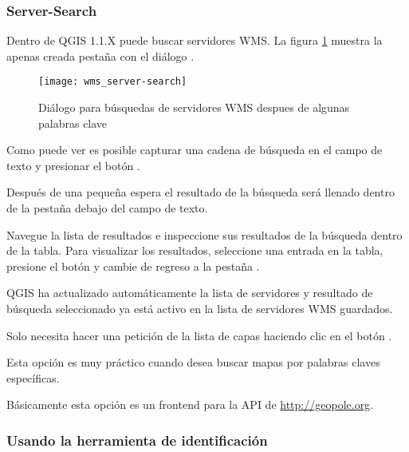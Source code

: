 % 
%
\subsubsection{Server-Search}
\label{sec:serversearch}

Dentro de QGIS 1.1.X puede buscar servidores WMS. 
La figura \ref{fig:searchtab} muestra la apenas creada pestaña  con el diálogo .

\begin{figure}[ht]
  \begin{center}
  	\caption{Diálogo para búsquedas de servidores WMS despues de algunas palabras clave \nixcaption}\label{fig:searchtab}
	\texttt{[image: wms\_server-search]}
  \end{center}
\end{figure}

Como puede ver es posible capturar una cadena de búsqueda en el campo de texto y presionar el botón .

Después de una pequeña espera el resultado de la búsqueda será llenado dentro de la pestaña debajo del campo de texto.

Navegue la lista de resultados e inspeccione sus resultados de la búsqueda dentro de la tabla. Para visualizar los resultados, seleccione una entrada en la tabla, presione el botón  y cambie de regreso a la pestaña .

QGIS ha actualizado automáticamente la lista de servidores y resultado de búsqueda seleccionado ya está activo en la lista de servidores WMS guardados.

Solo necesita hacer una petición de la lista de capas haciendo clic en el botón .

Esta opción es muy práctico cuando desea buscar mapas por palabras claves específicas.

Básicamente esta opción es un frontend para la API de
\url{http://geopole.org}.

\subsubsection{Usando la herramienta de identificación}\label{sec:ogc-wms-identify}

